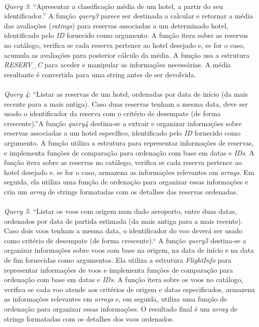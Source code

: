 \documentclass{article}
\begin{document}
\paragraph{}\textit{Query 3}: “Apresentar a classificação média de um hotel, a partir do seu identificador.”
A função \textit{query3} parece ser destinada a calcular e retornar a média das avaliações (\textit{ratings}) para reservas associadas a um determinado hotel, identificado pelo \textit{ID} fornecido como argumento. A função itera sobre as reservas no catálogo, verifica se cada reserva pertence ao hotel desejado e, se for o caso, acumula as avaliações para posterior cálculo da média. A função usa a estrutura  \textit{RESERV\_C} para aceder e manipular as informações necessárias. A média resultante é convertida para uma string antes de ser devolvida.
\paragraph{}\textit{Query 4}: “Listar as reservas de um hotel, ordenadas por data de início (da mais recente para a mais antiga). Caso duas reservas tenham a mesma data, deve ser usado o identificador da reserva com o critério de desempate (de forma crescente).”A função \textit{query4}  destina-se a extrair e organizar informações sobre reservas associadas a um hotel específico, identificado pelo \textit{ID} fornecido como argumento. A função utiliza  a estrutura para representar informações de reservas, e implementa funções de comparação para ordenação com base em datas e \textit{IDs}. A função itera sobre as reservas no catálogo, verifica se cada reserva pertence ao hotel desejado e, se for o caso, armazena as informações relevantes em \textit{arrays}. Em seguida, ela utiliza uma função de ordenação para organizar essas informações e cria um \textit{array} de strings formatadas com os detalhes das reservas ordenadas.
\paragraph{}\textit{Query 5}: “Listar os voos com origem num dado aeroporto, entre duas datas, ordenados por data de partida estimada (da mais antiga para a mais recente). Caso dois voos tenham a mesma data, o identificador do voo deverá ser usado como critério de desempate (de forma crescente).“
A função \textit{query5} destina-se a organizar informações sobre voos com base na origem, na data de início e na data de fim fornecidas como argumentos. Ela utiliza a estrutura \textit{FlightInfo} para representar informações de voos e implementa funções de comparação para ordenação com base em datas e \textit{IDs}. A função itera sobre os voos no catálogo, verifica se cada voo atende aos critérios de origem e datas especificados, armazena as informações relevantes em \textit{arrays} e, em seguida, utiliza uma função de ordenação para organizar essas informações. O resultado final é um \textit{array} de strings formatadas com os detalhes dos voos ordenados.
\end{document}
